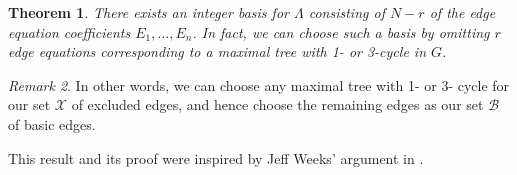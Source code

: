 \documentclass[12pt]{amsart}
\newtheorem{thm}{Theorem}[section]
\theoremstyle{definition}
\theoremstyle{remark}
\newtheorem{rmk}[thm]{Remark}
\begin{document}
\begin{thm} \label{pick_edges}
There exists an integer basis for $\Lambda$ consisting of $N-r$ 
of the edge equation coefficients $E_1, \ldots, E_n$.  In fact, we can choose
such a basis by omitting $r$ edge equations corresponding to a maximal tree with 1- or 3-cycle in $G$.
\end{thm}

\begin{rmk}
In other words, we can choose any maximal tree with 1- or 3- cycle for our set $\mathcal X$ of excluded edges, and hence choose the remaining edges as our set $\mathcal B$ of basic edges.
\end{rmk}

This result and its proof were inspired by Jeff Weeks' argument in
\cite[pp. 35--36]{Weeks:thesis}.
\end{document}
